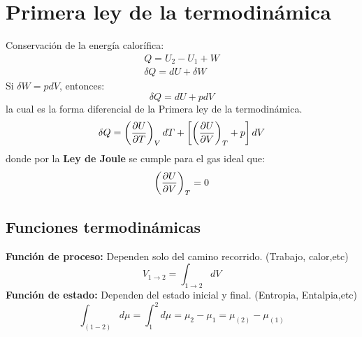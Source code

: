 \documentclass[../main]{subfiles}
\begin{document}
\chapter{Primera ley de la termodinámica}
Conservación de la energía calorífica:
\begin{align}
    Q=U_2-U_1+W\\
    \delta Q=dU+\delta W
\end{align}
Si $\delta W = p dV$, entonces:
\begin{equation}
    \delta Q=dU+pdV
\end{equation}
la cual es la forma diferencial de la Primera ley de la termodinámica.
\begin{equation}
    \delta Q=\left( \pdv{U}{T}\right)_V dT + \left[ \left(\pdv{U}{V}\right)_T+p\right]dV
\end{equation}
donde por la \textbf{Ley de Joule} se cumple para el gas ideal que:
\begin{equation}
    \left(\pdv{U}{V}\right)_T=0
\end{equation}
\section{Funciones termodinámicas}
\textbf{Función de proceso:} Dependen solo del camino recorrido. (Trabajo, calor,etc)
\begin{equation}
    V_{1\rightarrow 2}=\int_{1\rightarrow 2} dV
\end{equation}
\textbf{Función de estado:} Dependen del estado inicial y final. (Entropia, Entalpia,etc)
\begin{equation}
    \int_{(1-2)}d\mu =\int_1^2 d\mu=\mu_2-\mu_1=\mu_{(2)}-\mu_{(1)}
\end{equation}
\end{document}
